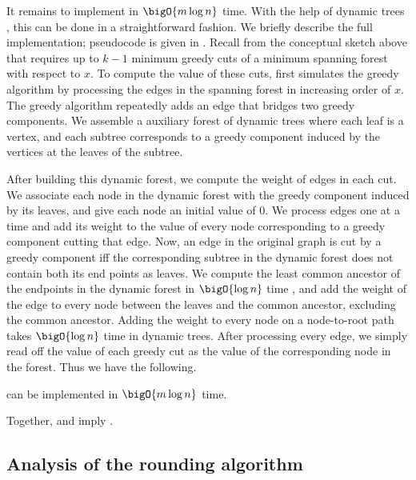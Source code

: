 \documentclass{toc}
\newcommand{\wrt}{with respect to\xspace} %
\begin{document}
%

It remains to implement  in $\bigO{m \log n}$
time. With the help of dynamic trees \cite{st-83}, this can be done
in a straightforward fashion. We briefly describe the full
implementation; pseudocode is given in . Recall
from the conceptual sketch above that  requires up
to $k-1$ minimum greedy cuts of a minimum spanning forest \wrt
$x$. To compute the value of these cuts,  first
simulates the greedy algorithm by processing the edges in the spanning
forest in increasing order of $x$. The greedy algorithm repeatedly
adds an edge that bridges two greedy components. We assemble a
auxiliary forest of dynamic trees where each leaf is a vertex, and
each subtree corresponds to a greedy component induced by the vertices
at the leaves of the subtree.

After building this dynamic forest, we compute the weight of edges in
each cut. We associate each node in the dynamic forest with the greedy
component induced by its leaves, and give each node an initial value
of 0. We process edges one at a time and add its weight to the value
of every node corresponding to a greedy component cutting that edge.
Now, an edge in the original graph is cut by a greedy component iff
the corresponding subtree in the dynamic forest does not contain both
its end points as leaves. We compute the least common ancestor of the
endpoints in the dynamic forest in $\bigO{\log n}$ time \cite{ht-84},
and add the weight of the edge to every node between the leaves and
the common ancestor, excluding the common ancestor. Adding the weight
to every node on a node-to-root path takes $\bigO{\log n}$ time
\cite{st-83} in dynamic trees. After processing every edge, we simply
read off the value of each greedy cut as the value of the
corresponding node in the forest. Thus we have the following.
\begin{lemma}
    can be implemented
  in $\bigO{m \log n}$ time.
\end{lemma}
Together,  and 
imply .


\subsection{Analysis of the rounding algorithm}


\providecommand{\cuts}{\mathcal{C}}
\end{document}
